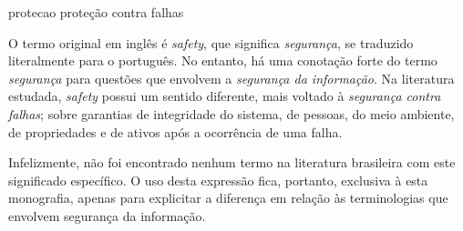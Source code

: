 \novadefinicao
    {protecao}
    {proteção contra falhas}
    {
        O termo original em inglês é \emph{safety}, que significa 
        \emph{segurança}, se traduzido literalmente para o português. No 
        entanto, há uma conotação forte do termo \emph{segurança} para questões 
        que envolvem a \emph{segurança da informação}. Na literatura estudada, 
        \emph{safety} possui um sentido diferente, mais voltado à 
        \emph{segurança contra falhas}; sobre garantias de integridade do 
        sistema, de pessoas, do meio ambiente, de propriedades e de ativos após 
        a ocorrência de uma falha.
        
        Infelizmente, não foi encontrado nenhum termo na literatura brasileira 
        com este significado específico. O uso desta expressão fica, portanto, 
        exclusiva à esta monografia, apenas para explicitar a diferença em 
        relação às terminologias que envolvem segurança da informação.
    }
